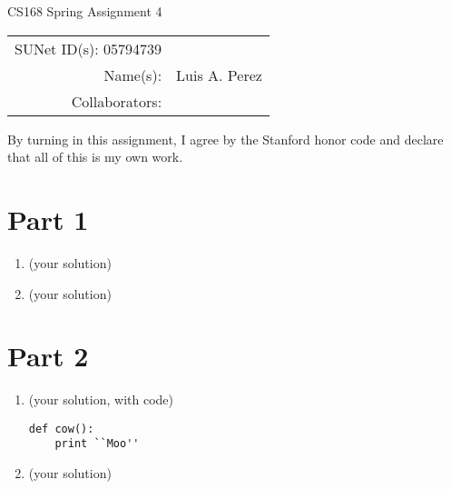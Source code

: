 \documentclass[12pt]{article}
\begin{document}
\begin{center}
{\Large CS168 Spring Assignment 4}

\begin{tabular}{rl}
SUNet ID(s): 05794739 & \\
Name(s): & Luis A. Perez \\
Collaborators: &
\end{tabular}
\end{center}

By turning in this assignment, I agree by the Stanford honor code and declare
that all of this is my own work.

\section*{Part 1}

\begin{enumerate}[label=(\alph*)]
  \item (your solution)
  \item (your solution)
\end{enumerate}

\section*{Part 2}

\begin{enumerate}[label=(\alph*)]
  \item (your solution, with code)
\begin{verbatim}
def cow():
    print ``Moo''
\end{verbatim}

  \item (your solution)
\end{enumerate}
\end{document}
